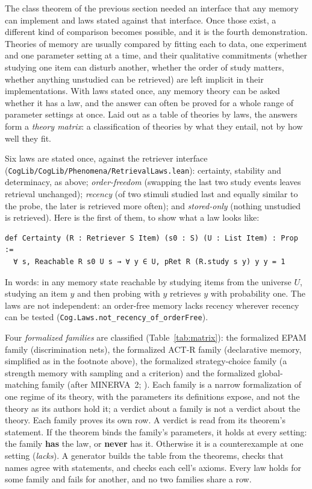 \documentclass[11pt]{article}
\newcommand{\code}[1]{\texttt{#1}}
\newcommand{\lean}[1]{\texttt{#1}}
\begin{document}
The class theorem of the previous section needed an interface that any
memory can implement and laws stated against that interface. Once those
exist, a different kind of comparison becomes possible, and it is the
fourth demonstration. Theories of memory are usually compared by
fitting each to data, one experiment and one parameter setting at a
time, and their qualitative commitments (whether studying one item can
disturb another, whether the order of study matters, whether anything
unstudied can be retrieved) are left implicit in their
implementations. With laws stated once, any memory theory can be asked
whether it has a law, and the answer can often be proved for a whole
range of parameter settings at once. Laid out as a table of theories
by laws, the answers form a \emph{theory matrix}: a classification of
theories by what they entail, not by how well they fit.

Six laws are stated once, against the retriever interface
(\code{CogLib/CogLib/Phenomena/RetrievalLaws.lean}): certainty,
stability and determinacy, as above; \emph{order-freedom} (swapping
the last two study events leaves retrieval unchanged); \emph{recency}
(of two stimuli studied last and equally similar to the probe, the
later is retrieved more often); and \emph{stored-only} (nothing
unstudied is retrieved). Here is the first of them, to show what a law
looks like:
\begin{Verbatim}[fontsize=\small]
def Certainty (R : Retriever S Item) (s0 : S) (U : List Item) : Prop :=
  ∀ s, Reachable R s0 U s → ∀ y ∈ U, pRet R (R.study s y) y y = 1
\end{Verbatim}
In words: in any memory state reachable by studying items from the
universe $U$, studying an item $y$ and then probing with $y$ retrieves
$y$ with probability one. The laws are not independent: an order-free
memory lacks recency wherever recency can be tested
(\lean{Cog.Laws.not\_recency\_of\_orderFree}).

Four \emph{formalized families} are classified (Table~\ref{tab:matrix}):
the formalized EPAM family (discrimination nets), the formalized ACT-R
family (declarative memory, simplified as in the footnote above), the
formalized strategy-choice family (a strength memory with sampling and
a criterion) and the formalized global-matching family (after
MINERVA~2; \citealp{hintzman1984}). Each family is a narrow
formalization of one regime of its theory, with the parameters its
definitions expose, and not the theory as its authors hold it; a
verdict about a family is not a verdict about the theory. Each family
proves its own row. A verdict is read from its theorem's statement. If
the theorem binds the family's parameters, it holds at every setting:
the family \textbf{has} the law, or \textbf{never} has it. Otherwise it
is a counterexample at one setting (\emph{lacks}). A generator builds
the table from the theorems, checks that names agree with statements,
and checks each cell's axioms. Every law holds for some family and
fails for another, and no two families share a row.
\end{document}
